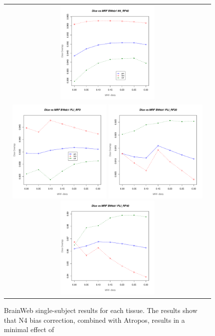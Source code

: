 \documentclass[11pt,english]{article}
\begin{document}
\begin{figure}
\begin{center}
\begin{tabular}{c}
\includegraphics[height=2in]{Figures/tissue_dice_vs_mrf_N4_RF40.pdf}\\
\includegraphics[height=2in]{Figures/tissue_dice_vs_mrf_PLI_RF0.pdf}
\includegraphics[height=2in]{Figures/tissue_dice_vs_mrf_PLI_RF20.pdf}
\includegraphics[height=2in]{Figures/tissue_dice_vs_mrf_PLI_RF40.pdf}
\end{tabular}
\caption{\baselineskip 12pt \small BrainWeb single-subject results for
  each tissue.  The results show that N4 bias correction, combined with Atropos, results in a minimal effect of
}
\end{center}
\end{figure}
\end{document}
